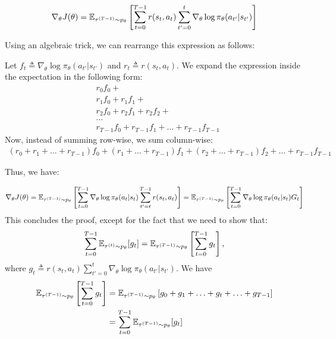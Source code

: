 \documentclass{article}
\begin{document}
\begin{tcolorbox}[breakable,enhanced,colback=gray!10!white,colframe=gray!50!black,
title={Policy Gradient Derivation for $J(\theta) = \sum_{t=0}^{T-1} \BBE_{\tau^{(t)} \sim p_\theta}[r(s_t, a_t)]$}]
\begin{align*}
    \nabla_\theta J(\theta) = {\mathbb E}_{\tau^{(T-1)} \sim p_\theta} \left[ \sum_{t=0}^{T-1} r(s_t,a_t) \sum_{t'=0}^{t} \nabla_\theta \log \pi_\theta(a_{t'} \vert s_{t'}) \right]
\end{align*}

Using an algebraic trick, we can rearrange this expression as follows:

Let $f_t \triangleq \nabla_\theta \log \pi_\theta(a_{t'} \vert s_{t'})$ and $r_t \triangleq r(s_t,a_t)$. We expand the expression inside the expectation in the following form:
\begin{align*}
&r_0 f_0 +\\
&r_1 f_0 + r_1 f_1 +\\
&r_2 f_0 + r_2 f_1 + r_2 f_2 +\\
&\ldots \\
&r_{T-1} f_0 + r_{T-1} f_1 + \ldots + r_{T-1} f_{T-1}
\end{align*}
Now, instead of summing row-wise, we sum column-wise:
\begin{align*}
(r_0 + r_1 + \ldots + r_{T-1}) f_0 + (r_1 + \ldots + r_{T-1}) f_1 + (r_2 + \ldots + r_{T-1}) f_2 + \ldots + r_{T-1} f_{T-1}   
\end{align*}

Thus, we have:

\begin{align*}
\nabla_\theta J(\theta) = {\mathbb E}_{\tau^{(T-1)} \sim p_\theta} \left[ \sum_{t=0}^{T-1} \nabla_\theta \log \pi_\theta(a_t \vert s_t) \sum_{t'=t}^{T-1} r(s_t,a_t) \right] = {\mathbb E}_{\tau^{(T-1)} \sim p_\theta} \left[ \sum_{t=0}^{T-1} \nabla_\theta \log \pi_\theta(a_t \vert s_t) G_t \right]
\end{align*}
This concludes the proof, except for the fact that we need to show that:
\begin{align}\label{eq:traj_exp}
    \sum_{t=0}^{T-1} {\mathbb E}_{\tau^{(t)} \sim p_\theta}[g_t] = {\mathbb E}_{\tau^{(T-1)} \sim p_\theta}\left[\sum_{t=0}^{T-1} g_t\right],
\end{align}
where $g_t \triangleq r(s_t, a_t) \sum_{t'=0}^{t} \nabla_\theta \log \pi_\theta(a_{t'} \vert s_{t'})$.
We have
\begin{align*}
{\mathbb E}_{\tau^{(T-1)} \sim p_\theta} \left[\sum_{t=0}^{T-1} g_t\right] 
&= {\mathbb E}_{\tau^{(T-1)} \sim p_\theta} \left[g_0 + g_1 + \ldots + g_t + \ldots + g_{T-1}\right]\\
&=\sum_{t=0}^{T-1}{\mathbb E}_{\tau^{(T-1)} \sim p_\theta} [g_t]
\end{align*}


\end{tcolorbox}
\end{document}
